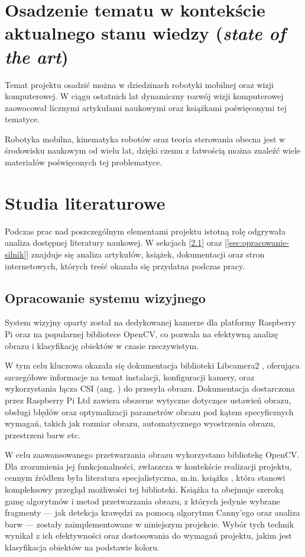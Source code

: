 \section{Osadzenie tematu w kontekście aktualnego stanu wiedzy (\textit{state of the art})}
\label{sec:state_of_the_art}

Temat projektu osadzić można w dziedzinach robotyki mobilnej oraz wizji komputerowej. W ciągu ostatnich lat dynamiczny rozwój wizji komputerowej zaowocował licznymi artykułami naukowymi oraz książkami poświęconymi tej tematyce. 

Robotyka mobilna, kinematyka robotów oraz teoria sterowania obecna jest w środowisku naukowym od wielu lat, dzięki czemu z łatwością można znaleźć wiele materiałów poświęconych tej problematyce. 

\section{Studia literaturowe}
\label{sec:studia_literaturowe}

Podczas prac nad poszczególnym elementami projektu istotną rolę odgrywała analiza dostępnej literatury naukowej. W sekcjach [\ref{sec:opracowania-wizja}] oraz [\ref{sec:opracowanie-silnik}] znajduje się analiza artykułów, książek, dokumentacji oraz stron internetowych, których treść okazała się przydatna podczas pracy. 

\subsection{Opracowanie systemu wizyjnego}
\label{sec:opracowania-wizja}

System wizyjny oparty został na dedykowanej kamerze dla platformy Raspberry Pi oraz na popularnej bibliotece OpenCV, co pozwala na efektywną analizę obrazu i klasyfikację obiektów w czasie rzeczywistym. 

W tym celu kluczowa okazała się dokumentacja biblioteki Libcamera2 \cite{bib:manualLibcamera2}, oferująca szczegółowe informacje na temat instalacji, konfiguracji kamery, oraz wykorzystania łącza CSI (ang. ) do przesyła obrazu. Dokumentacja dostarczona przez Raspberry Pi Ltd zawiera obszerne wytyczne dotyczące ustawień obrazu, obsługi błędów oraz optymalizacji parametrów obrazu pod kątem specyficznych wymagań, takich jak rozmiar obrazu, automatycznego wyostrzenia obrazu, przestrzeni barw etc.

W celu zaawansowanego przetwarzania obrazu wykorzystano bibliotekę OpenCV. Dla zrozumienia jej funkcjonalności, zwłaszcza w kontekście realizacji projektu, cennym źródłem była literatura specjalistyczna, m.in. książka \cite{bib:ksiazka}, która stanowi kompleksowy przegląd możliwości tej biblioteki. Książka ta obejmuje szeroką gamę algorytmów i metod przetwarzania obrazu, z których jedynie wybrane fragmenty — jak detekcja krawędzi za pomocą algorytmu Canny’ego oraz analiza barw — zostały zaimplementowane w niniejszym projekcie. Wybór tych technik wynikał z ich efektywności oraz dostosowania do wymagań projektu, jakim jest klasyfikacja obiektów na podstawie koloru.

